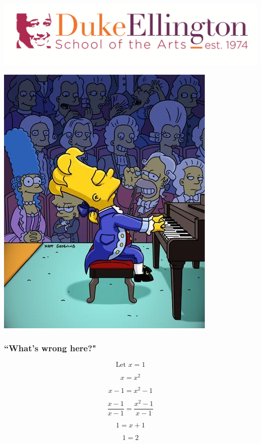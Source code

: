 \documentclass{beamer}
\theoremstyle{mystyle}
\begin{document}
\begin{frame}

\begin{center}
	\includegraphics[scale=0.5]{desa.jpg}
	
	\includegraphics[scale=0.35]{bartpianist.jpg}
\end{center}

\end{frame}


\begin{frame}
\frametitle{``What's wrong here?"}

\[\text{Let } x = 1\]

\pause

\[x = x^2\]

\pause

\[x - 1 = x^2 - 1\]

\pause

\[\frac{x - 1}{x - 1} = \frac{x^2 - 1}{x - 1}\]

\pause

\[ 1 = x+1\]

\pause

\[1 = 2\]
\end{frame}
\end{document}
